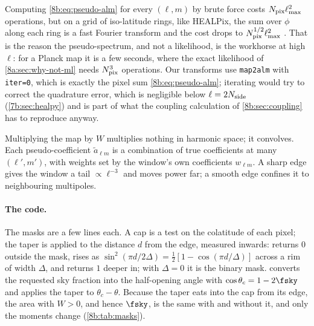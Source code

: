 Computing \eqref{8b:eq:pseudo-alm} for every $(\ell,m)$ by brute force costs
$N_{\rm pix}\ell_{\max}^2$ operations, but on a grid of iso-latitude rings, like HEALPix, the sum
over $\phi$ along each ring is a fast Fourier transform and the cost drops to
$N_{\rm pix}^{1/2}\ell_{\max}^2$ . That is the reason the pseudo-spectrum,
and not a likelihood, is the workhorse at high $\ell$: for a Planck map it is a few seconds, where
the exact likelihood of \cref{8a:sec:why-not-ml} needs $N_{\rm pix}^3$ operations. Our
transforms use \texttt{map2alm} with \texttt{iter=0}, which is exactly the pixel sum
\eqref{8b:eq:pseudo-alm}; iterating would try to correct the quadrature error, which is
negligible below $\ell=2N_{\rm side}$ (\cref{7b:sec:healpy}) and is part of what the coupling
calculation of \cref{8b:sec:coupling} has to reproduce anyway.

\begin{keyidea}
Multiplying the map by $W$ multiplies nothing in harmonic space; it convolves. Each pseudo-coefficient
$\tilde a_{\ell m}$ is a combination of true coefficients at many $(\ell',m')$, with weights set by
the window's own coefficients $w_{\ell m}$. A sharp edge gives the window a tail $\propto\ell^{-3}$
and moves power far; a smooth edge confines it to neighbouring multipoles.
\end{keyidea}

\paragraph{The code.}
The masks are a few lines each. A cap is a test on the colatitude of each pixel; the taper is
applied to the distance $d$ from the edge, measured inwards:
\noindent
{} returns $0$ outside the mask, rises as $\sin^2(\pi d/2\Delta)=\frac12[1-\cos(\pi d/\Delta)]$
across a rim of width $\Delta$, and returns $1$ deeper in; with $\Delta=0$ it is the binary mask.
 converts the requested sky fraction into the half-opening angle with
$\cos\theta_c=1-2\fsky$ and applies the taper to $\theta_c-\theta$. Because the taper eats into the cap
from its edge, the area with $W>0$, and hence $\fsky$, is the same with and without it, and only the
moments change (\cref{8b:tab:masks}).

